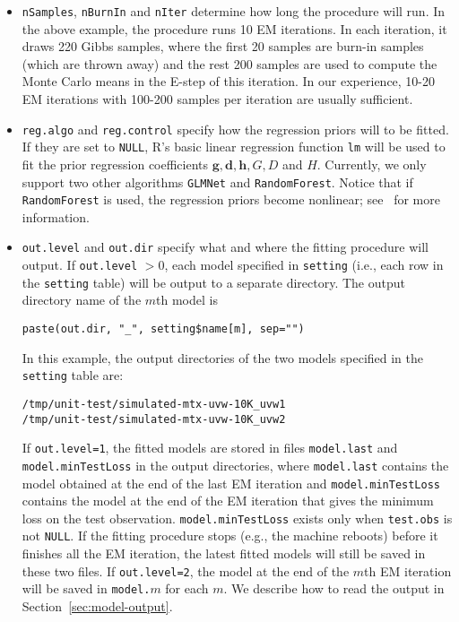\documentclass[10pt]{article}
\begin{document}
\begin{itemize}
\item {\tt nSamples}, {\tt nBurnIn} and {\tt nIter} determine how long the procedure will run.  In the above example, the procedure runs 10 EM iterations.  In each iteration, it draws 220 Gibbs samples, where the first 20 samples are burn-in samples (which are thrown away) and the rest 200 samples are used to compute the Monte Carlo means in the E-step of this iteration.  In our experience, 10-20 EM iterations with 100-200 samples per iteration are usually sufficient.
\item {\tt reg.algo} and {\tt reg.control} specify how the regression priors will to be fitted.  If they are set to {\tt NULL}, R's basic linear regression function {\tt lm} will be used to fit the prior regression coefficients $\bm{g}, \bm{d}, \bm{h}, G, D$ and $H$.  Currently, we only support two other algorithms {\tt GLMNet} and {\tt RandomForest}.  Notice that if {\tt RandomForest} is used, the regression priors become nonlinear; see~\cite{gmf:recsys11} for more information.
\item {\tt out.level} and {\tt out.dir} specify what and where the fitting procedure will output.  If {\tt out.level} $> 0$, each model specified in {\tt setting} (i.e., each row in the {\tt setting} table) will be output to a separate directory.  The output directory name of the $m$th model is
{\small\begin{verbatim}
paste(out.dir, "_", setting$name[m], sep="")
\end{verbatim}}
In this example, the output directories of the two models specified in the {\tt setting} table are:
{\small\begin{verbatim}
/tmp/unit-test/simulated-mtx-uvw-10K_uvw1
/tmp/unit-test/simulated-mtx-uvw-10K_uvw2
\end{verbatim}}
If {\tt out.level=1}, the fitted models are stored in files {\tt model.last} and {\tt model.minTestLoss} in the output directories, where {\tt model.last} contains the model obtained at the end of the last EM iteration and {\tt model.minTestLoss} contains the model at the end of the EM iteration that gives the minimum loss on the test observation.  {\tt model.minTestLoss} exists only when {\tt test.obs} is not {\tt NULL}.  If the fitting procedure stops (e.g., the machine reboots) before it finishes all the EM iteration, the latest fitted models will still be saved in these two files.  If {\tt out.level=2}, the model at the end of the $m$th EM iteration will be saved in {\tt model.$m$} for each $m$.  We describe how to read the output in Section~\ref{sec:model-output}.
\end{itemize}
\end{document}
